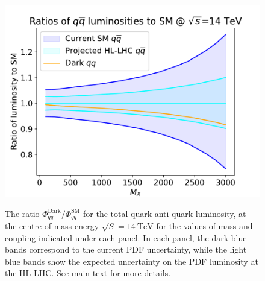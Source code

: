 \documentclass[withindex,glossary]{cam-thesis}
\begin{document}
\begin{figure}[bht]
{ \includegraphics[scale=0.43]{darkphoton_figures/mB_5_alphaB_3e-3_qqbar_luminosity_14TeV.pdf}}
 \quad
\caption{The ratio $\Phi_{q\bar{q}}^{\text{Dark}}/\Phi_{q\bar{q}}^{\text{SM}}$ for
  the total quark-anti-quark luminosity, at the centre of mass energy
  $\sqrt{S} = 14\ \text{TeV}$ for the values of mass and coupling
  indicated under each panel. 
  In each panel, the dark blue bands correspond to the current PDF
  uncertainty, while the light blue bands show the expected uncertainty on the
  PDF luminosity at the HL-LHC. See main text for more details.}
\label{fig:14tevlumis}
\end{figure}
\end{document}
